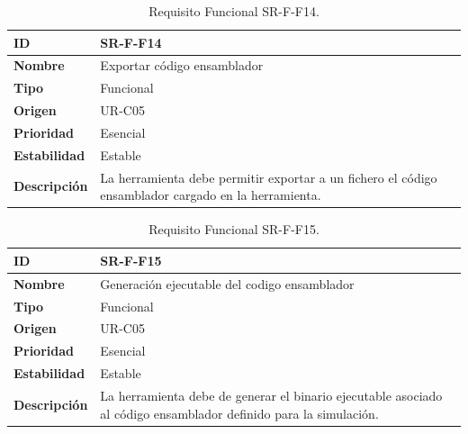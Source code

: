 \begin{center}
\begin{table}[htbp]
\centering
\begin{tabular}{@{}p{2.5cm} p{9cm}@{}} 
\toprule
\textbf{ID} 				& SR-F-F14 \\
\midrule
\textbf{Nombre} 			& Exportar código ensamblador\\
\midrule
\textbf{Tipo} 			& Funcional \\
\midrule
\textbf{Origen} 			& UR-C05 \\
\midrule
\textbf{Prioridad}		& Esencial \\
\midrule
\textbf{Estabilidad} 		& Estable \\
\midrule
\textbf{Descripción} 	& La herramienta debe permitir exportar a un fichero el código ensamblador cargado en la herramienta. \\
\bottomrule
\end{tabular}
\caption{Requisito Funcional SR-F-F14.}
\label{tab:srff14}
\end{table}
\end{center}

\begin{center}
\begin{table}[htbp]
\centering
\begin{tabular}{@{}p{2.5cm} p{9cm}@{}} 
\toprule
\textbf{ID} 				& SR-F-F15 \\
\midrule
\textbf{Nombre} 			& Generación ejecutable del codigo ensamblador\\
\midrule
\textbf{Tipo} 			& Funcional \\
\midrule
\textbf{Origen} 			& UR-C05 \\
\midrule
\textbf{Prioridad}		& Esencial \\
\midrule
\textbf{Estabilidad} 		& Estable \\
\midrule
\textbf{Descripción} 	& La herramienta debe de generar el binario ejecutable asociado al código ensamblador definido para la simulación. \\
\bottomrule
\end{tabular}
\caption{Requisito Funcional SR-F-F15.}
\label{tab:srff15}
\end{table}
\end{center}

